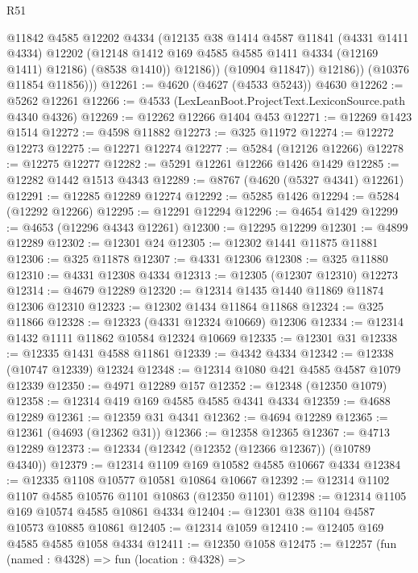 \begin{lexlean}{R51}
\begin{coremodule}
                  @11842
                  @4585
                  @12202
                  @4334
                  (@12135
                    @38
                    @1414
                    @4587
                    @11841
                    (@4331 @1411 @4334)
                    @12202
                    (@12148 @1412 @169 @4585 @4585 @1411 @4334 (@12169 @1411) @12186)
                    (@8538 @1410))
                  @12186))
              (@10904 @11847))
            @12186))
        (@10376 @11854 @11856)))
@12261 := @4620 (@4627 (@4533 @5243)) @4630
@12262 := @5262 @12261
@12266 := @4533 (LexLeanBoot.ProjectText.LexiconSource.path @4340 @4326)
@12269 := @12262 @12266 @1404 @453
@12271 := @12269 @1423 @1514
@12272 := @4598 @11882
@12273 := @325 @11972
@12274 := @12272 @12273
@12275 := @12271 @12274
@12277 := @5284 (@12126 @12266)
@12278 := @12275 @12277
@12282 := @5291 @12261 @12266 @1426 @1429
@12285 := @12282 @1442 @1513 @4343
@12289 := @8767 (@4620 (@5327 @4341) @12261)
@12291 := @12285 @12289 @12274
@12292 := @5285 @1426
@12294 := @5284 (@12292 @12266)
@12295 := @12291 @12294
@12296 := @4654 @1429
@12299 := @4653 (@12296 @4343 @12261)
@12300 := @12295 @12299
@12301 := @4899 @12289
@12302 := @12301 @24
@12305 := @12302 @1441 @11875 @11881
@12306 := @325 @11878
@12307 := @4331 @12306
@12308 := @325 @11880
@12310 := @4331 @12308 @4334
@12313 := @12305 (@12307 @12310) @12273
@12314 := @4679 @12289
@12320 := @12314 @1435 @1440 @11869 @11874 @12306 @12310
@12323 := @12302 @1434 @11864 @11868
@12324 := @325 @11866
@12328 := @12323 (@4331 @12324 @10669) @12306
@12334 := @12314 @1432 @1111 @11862 @10584 @12324 @10669
@12335 := @12301 @31
@12338 := @12335 @1431 @4588 @11861
@12339 := @4342 @4334
@12342 := @12338 (@10747 @12339) @12324
@12348 := @12314 @1080 @421 @4585 @4587 @1079 @12339
@12350 := @4971 @12289 @157
@12352 := @12348 (@12350 @1079)
@12358 := @12314 @419 @169 @4585 @4585 @4341 @4334
@12359 := @4688 @12289
@12361 := @12359 @31 @4341
@12362 := @4694 @12289
@12365 := @12361 (@4693 (@12362 @31))
@12366 := @12358 @12365
@12367 := @4713 @12289
@12373 := @12334 (@12342 (@12352 (@12366 @12367)) (@10789 @4340))
@12379 := @12314 @1109 @169 @10582 @4585 @10667 @4334
@12384 := @12335 @1108 @10577 @10581 @10864 @10667
@12392 := @12314 @1102 @1107 @4585 @10576 @1101 @10863 (@12350 @1101)
@12398 := @12314 @1105 @169 @10574 @4585 @10861 @4334
@12404 := @12301 @38 @1104 @4587 @10573 @10885 @10861
@12405 := @12314 @1059
@12410 := @12405 @169 @4585 @4585 @1058 @4334
@12411 := @12350 @1058
@12475 := @12257
    (fun (named : @4328) =>
    fun (location : @4328) =>

\end{coremodule}
\end{lexlean}
